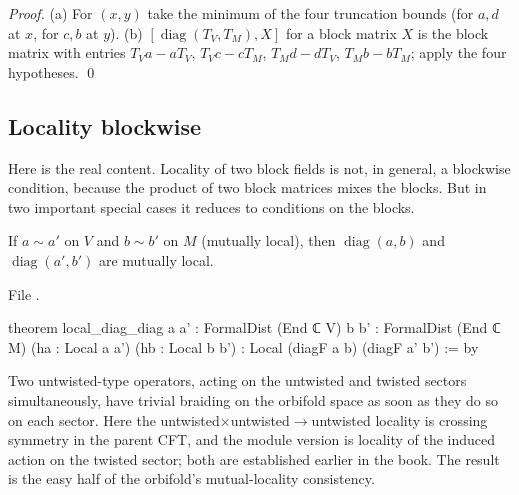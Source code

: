 \emph{Proof.} (a) For $(x,y)$ take the minimum of the four truncation bounds (for $a,d$ at $x$,
for $c,b$ at $y$).  (b) $[\operatorname{diag}(T_V,T_M),X]$ for a block matrix $X$ is the block
matrix with entries $T_Va-aT_V$, $T_Vc-cT_M$, $T_Md-dT_V$, $T_Mb-bT_M$; apply the four hypotheses.
\qed

\subsection{Locality blockwise}

Here is the real content.  Locality of two block fields is not, in general, a blockwise
condition, because the product of two block matrices mixes the blocks.  But in two important
special cases it reduces to conditions on the blocks.

\begin{theorem}\label{ch10:thm:diagdiag}
If $a\sim a'$ on $V$ and $b\sim b'$ on $M$ (mutually local), then $\operatorname{diag}(a,b)$ and
$\operatorname{diag}(a',b')$ are mutually local.
\end{theorem}
\noindent File .
\begin{leancode}
theorem local_diag_diag {a a' : FormalDist (End ℂ V)} {b b' : FormalDist (End ℂ M)}
    (ha : Local a a') (hb : Local b b') : Local (diagF a b) (diagF a' b') := by
\end{leancode}

\begin{physics}
Two untwisted-type operators, acting on the untwisted and twisted sectors simultaneously, have trivial braiding on the orbifold space as soon as they do so on each sector. Here the untwisted$\times$untwisted$\to$untwisted locality is crossing symmetry in the parent CFT, and the module version is locality of the induced action on the twisted sector; both are established earlier in the book. The result is the easy half of the orbifold's mutual-locality consistency.
\end{physics}

